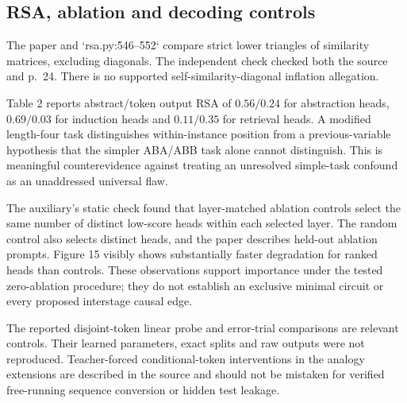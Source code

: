 \documentclass[10pt]{article}
\begin{document}
\subsection*{RSA, ablation and decoding controls}
The paper and `rsa.py:546–552` compare strict lower triangles of similarity matrices, excluding diagonals. The independent check checked both the source and p. 24. There is no supported self-similarity-diagonal inflation allegation.\par
Table 2 reports abstract/token output RSA of \(0.56/0.24\) for abstraction heads, \(0.69/0.03\) for induction heads and \(0.11/0.35\) for retrieval heads. A modified length-four task distinguishes within-instance position from a previous-variable hypothesis that the simpler ABA/ABB task alone cannot distinguish. This is meaningful counterevidence against treating an unresolved simple-task confound as an unaddressed universal flaw.\par
The auxiliary’s static check found that layer-matched ablation controls select the same number of distinct low-score heads within each selected layer. The random control also selects distinct heads, and the paper describes held-out ablation prompts. Figure 15 visibly shows substantially faster degradation for ranked heads than controls. These observations support importance under the tested zero-ablation procedure; they do not establish an exclusive minimal circuit or every proposed interstage causal edge.\par
The reported disjoint-token linear probe and error-trial comparisons are relevant controls. Their learned parameters, exact splits and raw outputs were not reproduced. Teacher-forced conditional-token interventions in the analogy extensions are described in the source and should not be mistaken for verified free-running sequence conversion or hidden test leakage.\par
\end{document}
